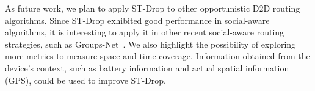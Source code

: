 As future work, we plan to apply ST-Drop to other opportunistic D2D routing algorithms. Since ST-Drop exhibited good performance in social-aware algorithms, it is interesting to apply it in other recent social-aware routing strategies, such as Groups-Net~\cite{nunes2016groups}. We also highlight the possibility of exploring more metrics to measure space and time
coverage. Information obtained from the device's context, such as battery information and actual spatial information (GPS), could be used to improve ST-Drop.